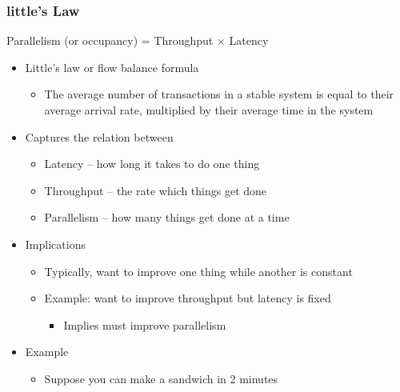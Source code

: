 \documentclass[12pt]{article}
\begin{document}
            \subsubsection{little’s Law}
                Parallelism (or occupancy) = Throughput × Latency
                \begin{itemize}
                    \item {Little’s law or flow balance formula}
                        \begin{itemize}
                            \item {The average number of transactions in a stable system is equal to their average arrival rate, multiplied by their average time in the system}
                        \end{itemize}
                    \item {Captures the relation between}
                        \begin{itemize}
                            \item {Latency – how long it takes to do one thing}
                            \item {Throughput – the rate which things get done}
                            \item {Parallelism – how many things get done at a time}
                        \end{itemize}
                    \item {Implications}
                        \begin{itemize}
                            \item {Typically, want to improve one thing while another is constant}
                            \item {Example: want to improve throughput but latency is fixed}
                                \begin{itemize}
                                    \item {Implies must improve parallelism}
                                \end{itemize}
                        \end{itemize}
                    \item {Example}
                        \begin{itemize}
                            \item {Suppose you can make a sandwich in 2 minutes}
                                \begin{itemize}

\end{itemize}
\end{itemize}
\end{itemize}
\end{document}
